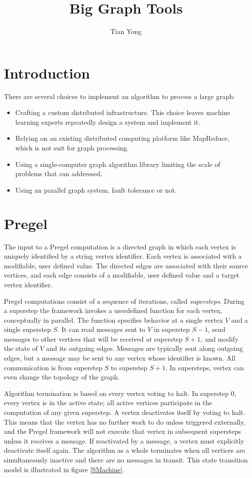 \documentclass {article}
\begin{document}
\title{Big Graph Tools}
\author{Tian Yong}
\maketitle
\section{Introduction}
There are several choices to implement an algorithm to process a large graph:
\begin{itemize}
  \item Crafting a custom distributed infrastructure. This choice leaves machine learning experts repeatedly design a system and implement it.
  \item Relying on an existing distributed computing platform like MapReduce, which is not suit for graph processing.
  \item Using a single-computer graph algorithm library limiting the scale of problems that can addressed.
  \item Using an parallel graph system, fault tolerance or not.
\end{itemize}
\section{Pregel}
The input to a Pregel computation is a directed graph in
which each vertex is uniquely identified by a string vertex
identifier. Each vertex is associated with a modifiable, user
defined value. The directed edges are associated with their
source vertices, and each edge consists of a modifiable, user
defined value and a target vertex identifier.


Pregel computations consist of a sequence of iterations, called \emph{supersteps}. During a superstep the framework invokes a userdefined function for each vertex, conceptually in parallel.
The function specifies behavior at a single vertex $V$ and a
single superstep $S$. It can read messages sent to $V$ in superstep $S-1$, send messages to other vertices that will be received at superstep $S + 1$, and modify the state of $V$ and
its outgoing edges. Messages are typically sent along outgoing edges, but a message may be sent to any vertex whose
identifier is known.  All communication is from superstep $S$ to superstep $S + 1$. In supersteps, vertex can even change the topology of the graph.

Algorithm termination is based on every vertex voting to
halt. In superstep 0, every vertex is in the active state; all
active vertices participate in the computation of any given
superstep. A vertex deactivates itself by voting to halt. This
means that the vertex has no further work to do unless triggered externally, and the Pregel framework will not execute
that vertex in subsequent supersteps unless it receives a message. If reactivated by a message, a vertex must explicitly deactivate itself again. The algorithm as a whole terminates
when all vertices are simultaneously inactive and there are
no messages in transit. This state transition model is illustrated in figure \ref{SMachine}.
\end{document}

